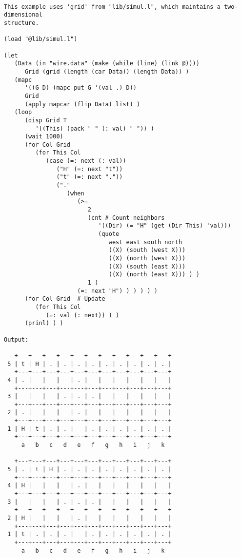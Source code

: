 \begin{verbatim}

This example uses 'grid' from "lib/simul.l", which maintains a two-dimensional
structure.

(load "@lib/simul.l")

(let
   (Data (in "wire.data" (make (while (line) (link @))))
      Grid (grid (length (car Data)) (length Data)) )
   (mapc
      '((G D) (mapc put G '(val .) D))
      Grid
      (apply mapcar (flip Data) list) )
   (loop
      (disp Grid T
         '((This) (pack " " (: val) " ")) )
      (wait 1000)
      (for Col Grid
         (for This Col
            (case (=: next (: val))
               ("H" (=: next "t"))
               ("t" (=: next "."))
               ("."
                  (when
                     (>=
                        2
                        (cnt # Count neighbors
                           '((Dir) (= "H" (get (Dir This) 'val)))
                           (quote
                              west east south north
                              ((X) (south (west X)))
                              ((X) (north (west X)))
                              ((X) (south (east X)))
                              ((X) (north (east X))) ) )
                        1 )
                     (=: next "H") ) ) ) ) )
      (for Col Grid  # Update
         (for This Col
            (=: val (: next)) ) )
      (prinl) ) )

Output:

   +---+---+---+---+---+---+---+---+---+---+---+
 5 | t | H | . | . | . | . | . | . | . | . | . |
   +---+---+---+---+---+---+---+---+---+---+---+
 4 | . |   |   |   | . |   |   |   |   |   |   |
   +---+---+---+---+---+---+---+---+---+---+---+
 3 |   |   |   | . | . | . |   |   |   |   |   |
   +---+---+---+---+---+---+---+---+---+---+---+
 2 | . |   |   |   | . |   |   |   |   |   |   |
   +---+---+---+---+---+---+---+---+---+---+---+
 1 | H | t | . | . |   | . | . | . | . | . | . |
   +---+---+---+---+---+---+---+---+---+---+---+
     a   b   c   d   e   f   g   h   i   j   k

   +---+---+---+---+---+---+---+---+---+---+---+
 5 | . | t | H | . | . | . | . | . | . | . | . |
   +---+---+---+---+---+---+---+---+---+---+---+
 4 | H |   |   |   | . |   |   |   |   |   |   |
   +---+---+---+---+---+---+---+---+---+---+---+
 3 |   |   |   | . | . | . |   |   |   |   |   |
   +---+---+---+---+---+---+---+---+---+---+---+
 2 | H |   |   |   | . |   |   |   |   |   |   |
   +---+---+---+---+---+---+---+---+---+---+---+
 1 | t | . | . | . |   | . | . | . | . | . | . |
   +---+---+---+---+---+---+---+---+---+---+---+
     a   b   c   d   e   f   g   h   i   j   k


\end{verbatim}
